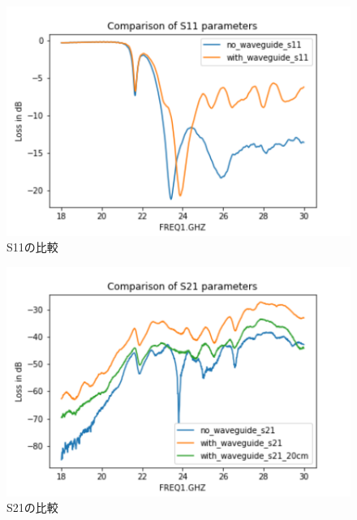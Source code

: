 \documentclass[technicalreport]{ieicej}
\begin{document}
\begin{figure}[tb]
  \begin{center}
    \includegraphics[bb=0 0 432.098422 288.065615, width=1.0\linewidth]{img/s11_comparison.pdf}
    \caption{S11の比較}
    \label{fig:s11_comparison}
  \end{center}
\end{figure}


\begin{figure}[tb]
  \begin{center}
    \includegraphics[bb=0 0 432.098422 288.065615, width=1.0\linewidth]{img/s21_comparison.pdf}
    \caption{S21の比較}
    \label{fig:s21_comparison}
  \end{center}
\end{figure}
\end{document}
